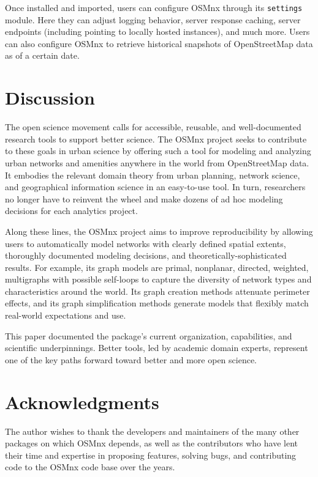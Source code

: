 \documentclass[12pt,letterpaper]{article} %
\begin{document}
Once installed and imported, users can configure OSMnx through its \texttt{settings} module. Here they can adjust logging behavior, server response caching, server endpoints (including pointing to locally hosted instances), and much more. Users can also configure OSMnx to retrieve historical snapshots of OpenStreetMap data as of a certain date.

\section{Discussion}

The open science movement calls for accessible, reusable, and well-documented research tools to support better science. The OSMnx project seeks to contribute to these goals in urban science by offering such a tool for modeling and analyzing urban networks and amenities anywhere in the world from OpenStreetMap data. It embodies the relevant domain theory from urban planning, network science, and geographical information science in an easy-to-use tool. In turn, researchers no longer have to reinvent the wheel and make dozens of ad hoc modeling decisions for each analytics project.

Along these lines, the OSMnx project aims to improve reproducibility by allowing users to automatically model networks with clearly defined spatial extents, thoroughly documented modeling decisions, and theoretically-sophisticated results. For example, its graph models are primal, nonplanar, directed, weighted, multigraphs with possible self-loops to capture the diversity of network types and characteristics around the world. Its graph creation methods attenuate perimeter effects, and its graph simplification methods generate models that flexibly match real-world expectations and use.

This paper documented the package's current organization, capabilities, and scientific underpinnings. Better tools, led by academic domain experts, represent one of the key paths forward toward better and more open science.

\section*{Acknowledgments}

The author wishes to thank the developers and maintainers of the many other packages on which OSMnx depends, as well as the contributors who have lent their time and expertise in proposing features, solving bugs, and contributing code to the OSMnx code base over the years.


\setlength{\bibsep}{0.00cm plus 0.05cm} %


\end{document}
